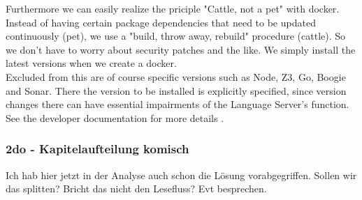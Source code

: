 Furthermore we can easily realize the priciple "Cattle, not a pet" with docker.
Instead of having certain package dependencies that need to be updated continuously (pet), we use a "build, throw away, rebuild" procedure (cattle). So we don't have to worry about security patches and the like. We simply install the latest versions when we create a docker. \\

Excluded from this are of course specific versions such as Node, Z3, Go, Boogie and Sonar.
There the version to be installed is explicitly specified, since version changes there
can have essential impairments of the Language Server's function. See the developer documentation for more details \cite{dev}. \\

\subsubsection{2do - Kapitelaufteilung komisch}
Ich hab hier jetzt in der Analyse auch schon die Lösung vorabgegriffen. Sollen wir das splitten? Bricht das nicht den Lesefluss? Evt besprechen.
